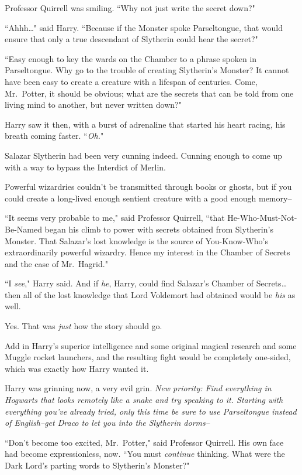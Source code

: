 Professor Quirrell was smiling. ``Why not just write the secret down?"

``Ahhh{\ldots}" said Harry. ``Because if the Monster spoke Parseltongue, that would ensure that only a true descendant of Slytherin could hear the secret?"

``Easy enough to key the wards on the Chamber to a phrase spoken in Parseltongue. Why go to the trouble of creating Slytherin's Monster? It cannot have been easy to create a creature with a lifespan of centuries. Come, Mr.~Potter, it should be obvious; what are the secrets that can be told from one living mind to another, but never written down?"

Harry saw it then, with a burst of adrenaline that started his heart racing, his breath coming faster. ``\emph{Oh.}"

Salazar Slytherin had been very cunning indeed. Cunning enough to come up with a way to bypass the Interdict of Merlin.

Powerful wizardries couldn't be transmitted through books or ghosts, but if you could create a long-lived enough sentient creature with a good enough memory\---

``It seems very probable to me," said Professor Quirrell, ``that He-Who-Must-Not-Be-Named began his climb to power with secrets obtained from Slytherin's Monster. That Salazar's lost knowledge is the source of You-Know-Who's extraordinarily powerful wizardry. Hence my interest in the Chamber of Secrets and the case of Mr.~Hagrid."

``I \emph{see}," Harry said. And if \emph{he}, Harry, could find Salazar's Chamber of Secrets{\ldots} then all of the lost knowledge that Lord Voldemort had obtained would be \emph{his} as well.

Yes. That was \emph{just} how the story should go.

Add in Harry's superior intelligence and some original magical research and some Muggle rocket launchers, and the resulting fight would be completely one-sided, which was exactly how Harry wanted it.

Harry was grinning now, a very evil grin. \emph{New priority: Find everything in Hogwarts that looks remotely like a snake and try speaking to it. Starting with everything you've already tried, only this time be sure to use Parseltongue instead of English\---get Draco to let you into the Slytherin dorms\---}

``Don't become too excited, Mr.~Potter," said Professor Quirrell. His own face had become expressionless, now. ``You must \emph{continue} thinking. What were the Dark Lord's parting words to Slytherin's Monster?"

